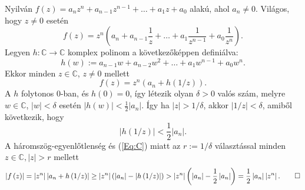 \documentclass[a4paper, showtrims]{memoir}
\makeatletter
\renewenvironment{proof}[1][\proofname]
    {\par\pushQED{\qed}%
    \normalfont \topsep6\p@\@plus6\p@\relax
    \trivlist
    \item[\hskip\labelsep
        \itshape
    #1\@addpunct{:}]\ignorespaces}
    {\popQED\endtrivlist\@endpefalse}
\theoremstyle{plain}
\theoremstyle{remark}
\theoremstyle{definition}
\makeatother
\begin{document}
\begin{proof}
	Nyilván $f\left( z\right) =a_{n}z^{n}+a_{n-1}z^{n-1}+\ldots +a_{1}z+a_{0}
	$ alakú, ahol $a_{n}\neq 0$.
	Világos, hogy $z\neq 0$ esetén
	\[
		f\left( z\right) =z^{n}\left( a_{n}+a_{n-1}\frac{1}{z}+\ldots +a_{1}\frac{1}{z^{n-1}}+a_{0}\frac{1}{z^{n}}\right) \text{.}
	\]
	Legyen $h:\mathbb{C}\rightarrow \mathbb{C}$ komplex polinom a következőképpen definiálva:
	\[
		h\left( w\right) :=a_{n-1}w+a_{n-2}w^{2}+\ldots +a_{1}w^{n-1}+a_{0}w^{n}.
	\]
	Ekkor minden $z\in \mathbb{C}$, $z\neq 0$ mellett
	\begin{equation}
		f\left( z\right) =z^{n}\left( a_{n}+h\left( 1/z\right) \right) .
		\label{Eq:C}
	\end{equation}
	A $h$ folytonos $0$-ban, és $h\left( 0\right) =0$, így létezik
	olyan $\delta >0$ valós szám, melyre $w\in \mathbb{C}$, $\left|
		w\right| <\delta $ esetén $\left| h\left( w\right) \right| <\frac{1}{2}\left| a_{n}\right| $.
	\'{I}gy ha $\left| z\right| >1/\delta $, akkor $\left| 1/z\right| <\delta $, amiből következik, hogy
	\[
		\left| h\left( 1/z\right) \right| <\frac{1}{2}\left| a_{n}\right| .
	\]
	A háromszög-egyenlőtlenség és (\ref{Eq:C}) miatt
	az $r:=1/\delta $ választással minden
	$z\in \mathbb{C},\left| z\right| >r$ mellett
	\[
		\left| f\left( z\right) \right|
		=
		\left| z^{n}\right| \left| a_{n}+h\left(1/z\right) \right| \geq \left| z^{n}\right| \left( \left| a_{n}\right|
		-\left| h\left( 1/z\right) \right| \right)
		>
		\left| z^{n}\right| \left( \left| a_{n}\right| -\frac{1}{2}\left|
		a_{n}\right| \right) =\frac{1}{2}\left| a_{n}\right| \left| z^{n}\right| .\qedhere
	\]
\end{proof}
\end{document}
